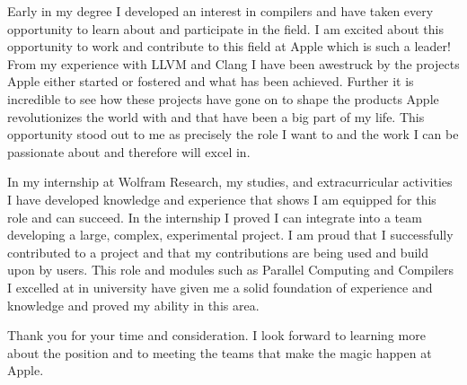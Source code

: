 \documentclass[11pt, a4paper]{awesome-cv} %
\begin{document}
\makecvheader %

\makelettertitle %


\begin{cvletter}

Early in my degree I developed an interest in compilers and have taken every opportunity to 
learn about and participate in the field. I am excited about this opportunity to work and contribute to 
this field at Apple which is such a leader! From my experience with LLVM and Clang I have been 
awestruck by the projects Apple either started or fostered and what has been achieved. 
Further it is incredible to see how these projects have gone on to shape the products Apple revolutionizes 
the world with and that have been a big part of my life. 
This opportunity stood out to me as precisely the role I want to and the work I can be passionate about and therefore will excel in.

In my internship at Wolfram Research, my studies, and extracurricular activities I have developed knowledge and 
experience that shows I am equipped for this role and can succeed.
In the internship I proved I can integrate into a team
developing a large, complex, experimental project. I am proud that I successfully contributed to a 
project and that my contributions are being used and build upon by users.
This role and modules such as Parallel Computing and Compilers I excelled at in university have given me
a solid foundation of experience and knowledge and proved my ability in this area.

Thank you for your time and consideration. I look forward to learning more about the position and 
to meeting the teams that make the magic happen at Apple.


\end{cvletter}


\makeletterclosing %
\end{document}

